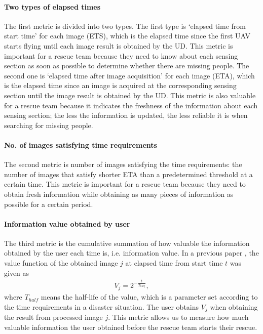 \documentclass{ieeeaccess}
\begin{document}
\paragraph*{Two types of elapsed times}
The first metric is divided into two types. 
The first type is `elapsed time from start time' for each image (ETS), which is the elapsed time since the first UAV starts flying until each image result is obtained by the UD. 
This metric is important for a rescue team because they need to know about each sensing section as soon as possible to determine whether there are missing people. 
The second one is `elapsed time after image acquisition' for each image (ETA), which is the elapsed time since an image is acquired at the corresponding sensing section until the image result is obtained by the UD. This metric is also valuable for a rescue team because it indicates the freshness of the information about each sensing section; the less the information is updated, the less reliable it is when searching for missing people.

\paragraph*{No. of images satisfying time requirements}
The second metric is number of images satisfying the time requirements: the number of images that satisfy shorter ETA than a predetermined threshold at a certain time. This metric is important for a rescue team because they need to obtain fresh information while obtaining as many pieces of information as possible for a certain period.

\paragraph*{Information value obtained by user}
The third metric is the cumulative summation of how valuable the information obtained by the user each time is, i.e. information value. In a previous paper \cite{NOMURA2001}, the value function of the obtained image $j$ at elapsed time from start time $t$ was given as
\begin{align}
V_j=2^{-\frac{t}{T_{half}}}, \label{eq_value}
\end{align}
where $T_{half}$ means the half-life of the value, which is a parameter set according to the time requirements in a disaster situation. The user obtains $V_j$ when obtaining the result from processed image $j$. This metric allows us to measure how much valuable information the user obtained before the rescue team starts their rescue. 
\end{document}
